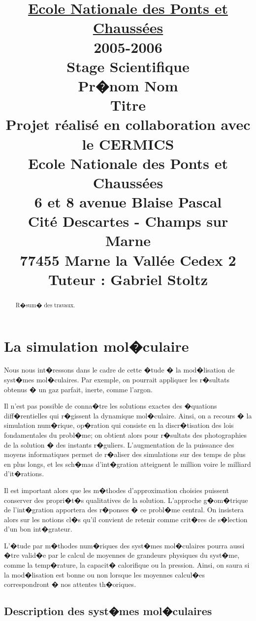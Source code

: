 \documentclass[a4paper,10pt,twoside]{report}
\title { 
 \Large{\textbf{\underline{Ecole Nationale des Ponts et Chauss\'ees}\\}}
 \vspace{0,7cm}
  \large{\textbf{2005-2006\\}}
  \vspace{1,5cm} \huge{\textbf{Stage Scientifique\\}}
  \vspace{0,7cm}\Large{\textbf{Pr�nom Nom\\}}
\vspace{1cm}
\huge{\textbf{Titre \\}}
\vspace{2cm}
\large{\textbf{Projet r\'ealis\'e  en collaboration avec le CERMICS\\ 
Ecole Nationale des Ponts et Chauss\'ees \\6 et 8 avenue Blaise Pascal\\
Cit\'e Descartes - Champs sur Marne\\
77455 Marne la Vall\'ee Cedex 2 \\}}
\vspace{2cm}
\Large{\textbf{Tuteur : Gabriel Stoltz}}
}
\begin{document}
\maketitle

\begin{abstract}
R�sum� des travaux.
\end{abstract}

\tableofcontents


\chapter{La simulation mol�culaire}

Nous nous int�ressons dans le cadre de cette �tude � la mod�lisation
de syst�mes mol�culaires. Par exemple, on pourrait appliquer les
r�sultats obtenus � un gaz parfait, inerte, comme l'argon. 

Il n'est pas possible de conna�tre les solutions exactes des �quations
diff�rentielles qui r�gissent la dynamique mol�culaire. Ainsi, on a
recours � la simulation num�rique, op�ration qui consiste en la
discr�tisation des lois fondamentales du probl�me; on obtient alors
pour r�sultats des photographies de la solution � des instants
r�guliers. L'augmentation de la puissance des moyens informatiques
permet de r�aliser des simulations sur des temps de plus en plus
longs, et les sch�mas d'int�gration atteignent le million voire le
milliard d'it�rations.

Il est important alors que les m�thodes d'approximation choisies
puissent conserver des propri�t�s qualitatives de la
solution. L'approche g�om�trique de l'int�gration apportera des
r�ponses � ce probl�me central. On insistera alors sur les notions
cl�s qu'il convient de retenir comme crit�res de s�lection d'un bon
int�grateur.  

L'�tude par m�thodes num�riques des syst�mes mol�culaires pourra aussi
�tre valid�e par le calcul de moyennes de grandeurs physiques du
syst�me, comme la temp�rature, la capacit� calorifique ou la
pression. Ainsi, on saura si la mod�lisation est bonne ou non lorsque
les moyennes calcul�es correspondront � nos attentes th�oriques. 

\section{Description des syst�mes mol�culaires}
\end{document}
